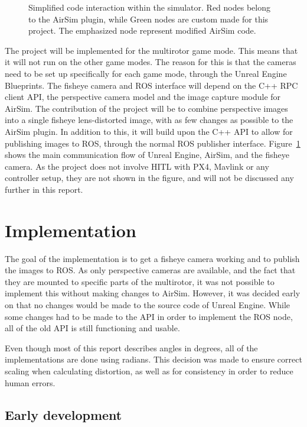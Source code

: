 \begin{figure}[!htb]
\begin{tikzpicture}[node distance=2.2cm, transform shape, scale=0.7]
    \end{tikzpicture}
    \caption{Simplified code interaction within the simulator. Red nodes belong to the AirSim plugin, while Green nodes are custom made for this project. The emphasized node represent modified AirSim code.}
    \label{fig:comm_pattern}
\end{figure}

The project will be implemented for the multirotor game mode. This means that it will not run on the other game modes. The reason for this is that the cameras need to be set up specifically for each game mode, through the Unreal Engine Blueprints. The fisheye camera and ROS interface will depend on the C++ RPC client API, the perspective camera model and the image capture module for AirSim. The contribution of the project will be to combine perspective images into a single fisheye lens-distorted image, with as few changes as possible to the AirSim plugin. In addition to this, it will build upon the C++ API to allow for publishing images to ROS, through the normal ROS publisher interface. Figure~\ref{fig:comm_pattern} shows the main communication flow of Unreal Engine, AirSim, and the fisheye camera. As the project does not involve HITL with PX4, Mavlink or any controller setup, they are not shown in the figure, and will not be discussed any further in this report.

\section{Implementation}

The goal of the implementation is to get a fisheye camera working and to publish the images to ROS. As only perspective cameras are available, and the fact that they are mounted to specific parts of the multirotor, it was not possible to implement this without making changes to AirSim. However, it was decided early on that no changes would be made to the source code of Unreal Engine. While some changes had to be made to the API in order to implement the ROS node, all of the old API is still functioning and usable.

Even though most of this report describes angles in degrees, all of the implementations are done using radians. This decision was made to ensure correct scaling when calculating distortion, as well as for consistency in order to reduce human errors.

\subsection{Early development} \label{sec:Early_dev}

